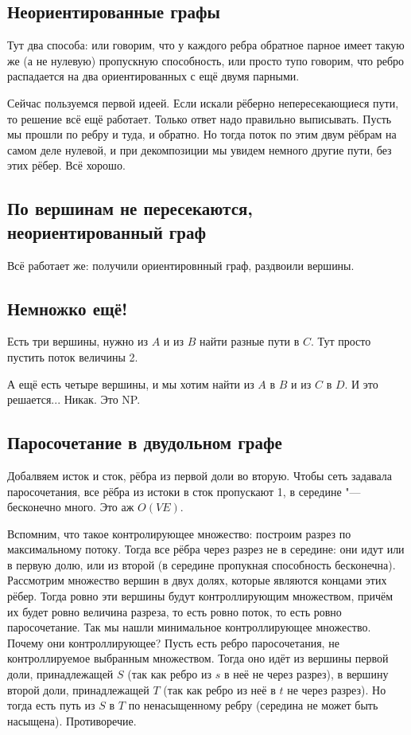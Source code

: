 \subsection{Неориентированные графы}
Тут два способа: или говорим, что у каждого ребра обратное парное имеет такую же (а не нулевую) пропускную способность,
или просто тупо говорим, что ребро распадается на два ориентированных с ещё двумя парными.

Сейчас пользуемся первой идеей.
Если искали рёберно непересекающиеся пути, то решение всё ещё работает.
Только ответ надо правильно выписывать.
Пусть мы прошли по ребру и туда, и обратно.
Но тогда поток по этим двум рёбрам на самом деле нулевой, и при декомпозиции мы увидем немного другие пути, без этих рёбер.
Всё хорошо.

\subsection{По вершинам не пересекаются, неориентированный граф}
Всё работает же: получили ориентировнный граф, раздвоили вершины.

\subsection{Немножко ещё!}
Есть три вершины, нужно из $A$ и из $B$ найти разные пути в $C$. Тут просто пустить поток величины 2.

А ещё есть четыре вершины, и мы хотим найти из $A$ в $B$ и из $C$ в $D$.
И это решается... Никак. Это NP.

\subsection{Паросочетание в двудольном графе}
Добалвяем исток и сток, рёбра из первой доли во вторую.
Чтобы сеть задавала паросочетания, все рёбра из истоки в сток пропускают 1, в середине "--- бесконечно много.
Это аж $O(VE)$.

Вспомним, что такое контролирующее множество: построим разрез по максимальному потоку.
Тогда все рёбра через разрез не в середине: они идут или в первую долю, или из второй (в середине пропукная способность бесконечна).
Рассмотрим множество вершин в двух долях, которые являются концами этих рёбер.
Тогда ровно эти вершины будут контроллирующим множеством, причём их будет ровно величина разреза, то есть ровно поток, то есть ровно паросочетание.
Так мы нашли минимальное контроллирующее множество.
Почему они контроллирующее?
Пусть есть ребро паросочетания, не контроллируемое выбранным множеством.
Тогда оно идёт из вершины первой доли, принадлежащей $S$ (так как ребро из $s$ в неё не через разрез), в вершину второй доли, принадлежащей $T$ (так как ребро из неё в $t$ не через разрез).
Но тогда есть путь из $S$ в $T$ по ненасыщенному ребру (середина не может быть насыщена). Противоречие.

